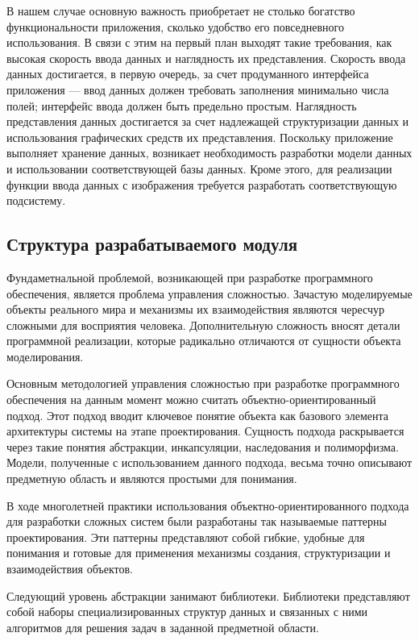 В нашем случае основную важность приобретает не столько богатство
функциональности приложения, сколько удобство его повседневного использования.
В связи с этим на первый план выходят такие требования, как
высокая скорость ввода данных и наглядность их представления.
Скорость ввода данных достигается, в первую очередь, за счет
продуманного интерфейса приложения ---
ввод данных должен требовать заполнения минимально числа полей;
интерфейс ввода должен быть предельно простым.
Наглядность представления данных достигается за счет надлежащей
структуризации данных и использования графических средств их представления.
Поскольку приложение выполняет хранение данных, возникает необходимость
разработки модели данных и использовании соответствующей базы данных.
Кроме этого, для реализации функции ввода данных с изображения
требуется разработать соответствующую подсистему.

\subsection{Структура разрабатываемого модуля}

Фундаметнальной проблемой, возникающей при разработке программного обеспечения,
является проблема управления сложностью. Зачастую моделируемые объекты реального
мира и механизмы их взаимодействия являются чересчур сложными для восприятия человека.
Дополнительную сложность вносят детали программной
реализации, которые радикально отличаются от сущности объекта моделирования.

Основным методологией управления сложностью при разработке программного обеспечения
на данным момент можно считать объектно-ориентированный подход.
Этот подход вводит ключевое понятие объекта как базового элемента
архитектуры системы на этапе проектирования.
Сущность подхода раскрывается через такие понятия абстракции, инкапсуляции,
наследования и полиморфизма.
Модели, полученные с использованием данного подхода, весьма точно
описывают предметную область и являются простыми для понимания.

В ходе многолетней практики использования объектно-ориентированного подхода
для разработки сложных систем были разработаны так называемые паттерны проектирования.
Эти паттерны представляют собой гибкие, удобные для понимания и
готовые для применения механизмы создания, структуризации и взаимодействия объектов.

Следующий уровень абстракции занимают библиотеки.
Библиотеки представляют собой наборы специализированных структур данных и
связанных с ними алгоритмов для решения задач в заданной предметной области.

